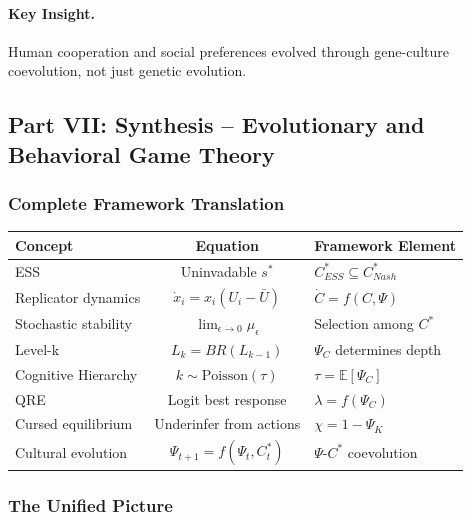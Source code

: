 \paragraph{Key Insight.}
Human cooperation and social preferences evolved through gene-culture 
coevolution, not just genetic evolution.

\subsection{Part VII: Synthesis – Evolutionary and Behavioral Game Theory}

\subsubsection{Complete Framework Translation}

\begin{center}
\renewcommand{\arraystretch}{1.5}
\begin{tabular}{|l|c|l|}
\hline
\textbf{Concept} & \textbf{Equation} & \textbf{Framework Element} \\
\hline
ESS & Uninvadable $s^*$ & $C^*_{ESS} \subseteq C^*_{Nash}$ \\
\hline
Replicator dynamics & $\dot{x}_i = x_i(U_i - \bar{U})$ & $\dot{C} = f(C, \Psi)$ \\
\hline
Stochastic stability & $\lim_{\epsilon \to 0} \mu_\epsilon$ & Selection among $C^*$ \\
\hline
Level-k & $L_k = BR(L_{k-1})$ & $\Psi_C$ determines depth \\
\hline
Cognitive Hierarchy & $k \sim \text{Poisson}(\tau)$ & $\tau = \mathbb{E}[\Psi_C]$ \\
\hline
QRE & Logit best response & $\lambda = f(\Psi_C)$ \\
\hline
Cursed equilibrium & Underinfer from actions & $\chi = 1 - \Psi_K$ \\
\hline
Cultural evolution & $\Psi_{t+1} = f(\Psi_t, C^*_t)$ & $\Psi$-$C^*$ coevolution \\
\hline
\end{tabular}
\end{center}

\subsubsection{The Unified Picture}

